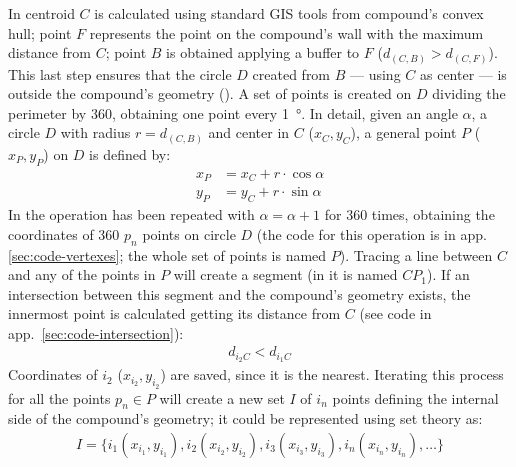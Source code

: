             In  centroid $C$ is calculated using standard GIS tools from compound's convex hull; point $F$ represents the point on the compound's wall with the maximum distance from $C$; point $B$ is obtained applying a buffer to $F$ ($d_{(C,B)} > d_{(C,F)}$). This last step ensures that the circle $D$ created from $B$ --- using $C$ as center --- is outside the compound's geometry (). A set of points is created on $D$ dividing the perimeter by 360, obtaining one point every \SI{1}{\degree}. In detail, given an angle $\alpha$, a circle $D$ with radius $r=d_{(C,B)}$ and center in $C$ ($x_C, y_C$), a general point $P$ ($x_P, y_P$) on $D$ is defined by:
            \begin{align}
                \label{eq:point-circle}
                x_P &= x_C + r\cdot\cos\alpha\\
                y_P &= y_C + r\cdot\sin\alpha
            \end{align}
            In  the operation has been repeated with $\alpha=\alpha+1$ for 360 times, obtaining the coordinates of 360 $p_n$ points on circle $D$ (the code for this operation is in app.\ref{sec:code-vertexes}; the whole set of points is named $P$). Tracing a line between $C$ and any of the points in $P$ will create a segment (in  it is named $CP_1$). If an intersection between this segment and the compound's geometry exists, the innermost point is calculated getting its distance from $C$ (see code in app.~\ref{sec:code-intersection}):
            \begin{align}
                \label{eq:innerpoint}
                d_{i_2 C} < d_{i_1 C}
            \end{align}
            Coordinates of $i_2$ ($x_{i_2}, y_{i_2}$) are saved, since it is the nearest. Iterating this process for all the points $p_n\in P$ will create a new set $I$ of $i_n$ points defining the internal side of the compound's geometry; it could be represented using set theory \cite{molenaar2003} as:
            \begin{align}
                \label{inter-set}
                I = \{ i_1 (x_{i_1}, y_{i_1}), i_2 (x_{i_2}, y_{i_2}), i_3 (x_{i_3}, y_{i_3}), i_n (x_{i_n}, y_{i_n}), \ldots \}
            \end{align}

